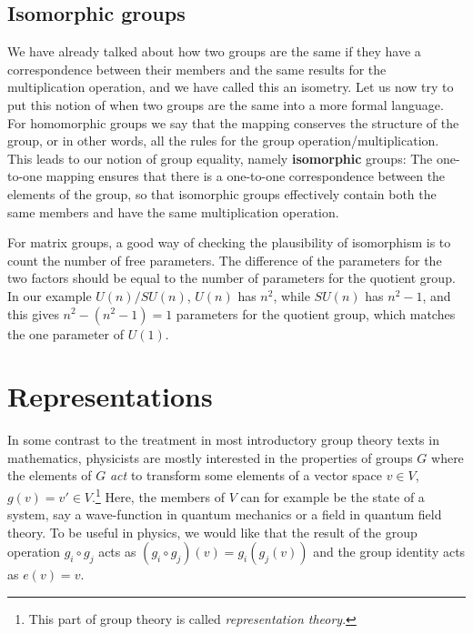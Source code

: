 \documentclass[notes.tex]{subfiles}
\begin{document}
\subsection{Isomorphic groups}
We have already talked about how two groups are the same if they have a correspondence between their members and the same results for the multiplication operation, and we have called this an isometry. Let us now try to put this notion of when two groups are the same into a more formal language.
For homomorphic groups we say that the mapping conserves the structure of the group, or in other words, all the rules for the group operation/multiplication. This leads to our notion of group equality, namely {\bf isomorphic} groups:
The one-to-one mapping ensures that there is a one-to-one correspondence between the elements of the group, so that isomorphic groups effectively contain both the same members and have the same multiplication operation.

For matrix groups, a good way of checking the plausibility of isomorphism is to count the number of free parameters. The difference of the parameters for the two factors should be equal to the number of parameters for the quotient group. In our example $U(n)/SU(n)$, $U(n)$ has $n^2$, while $SU(n)$ has $n^2-1$, and this gives $n^2-(n^2-1)=1$ parameters for the quotient group, which matches the one parameter of $U(1)$. 


\section{Representations}
\label{sec:rep}
In some contrast to the treatment in most introductory group theory texts in mathematics, physicists are mostly interested in the properties of groups $G$ where the elements of $G$ {\it act} to transform some elements of a vector space $v\in V$, $g(v) = v' \in V$.\footnote{This part of group theory is called {\it representation theory}.} Here, the members of $V$ can for example be the state of a system, say a wave-function in quantum mechanics or a field in quantum field theory. 
To be useful in physics, we would like that the result of the group operation $g_i \circ g_j$ acts as $(g_i\circ g_j)(v) = g_i(g_j(v))$ and the group identity acts as $e(v) = v$.
\end{document}
